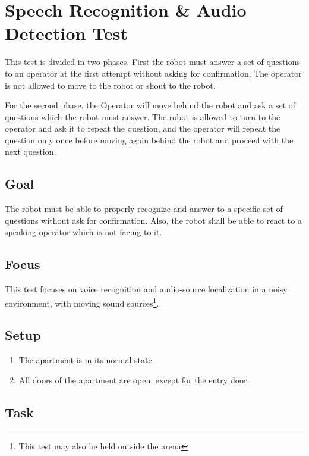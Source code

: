 \section{Speech Recognition \& Audio Detection Test}

This test is divided in two phases. First the robot must answer a set of questions to an operator at the first attempt without asking for confirmation. The operator is not allowed to move to the robot or shout to the robot.

For the second phase, the Operator will move behind the robot and ask a set of questions which the robot must answer. The robot is allowed to turn to the operator and ask it to repeat the question, and the operator will repeat the question only once before moving again behind the robot and proceed with the next question.

\subsection{Goal}
The robot must be able to properly recognize and answer to a specific set of questions without ask for confirmation. Also, the robot shall be able to react to a speaking operator which is not facing to it.

\subsection{Focus}

This test focuses on voice recognition and audio-source localization in a noisy environment, with moving sound sources\footnote{This test may also be held outside the arena}.

\subsection{Setup}
\begin{enumerate}
\item The apartment is in its normal state.
\item All doors of the apartment are open, except for the entry door. 
\end{enumerate}

\subsection{Task}

